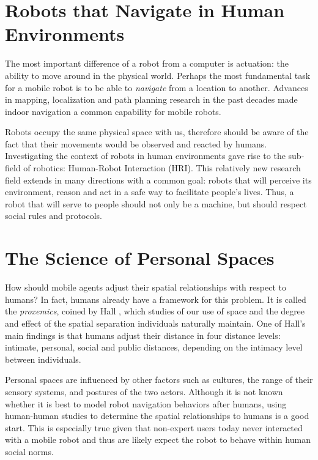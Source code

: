 \documentclass[12pt]{gatech-thesis}
\begin{document}
\section{Robots that Navigate in Human Environments}

The most important difference of a robot from a computer is actuation: the ability to move around in the physical world. Perhaps the most fundamental task for a mobile robot is to be able to \textit{navigate} from a location to another. Advances in mapping, localization and path planning research in the past decades made indoor navigation a common capability for mobile robots. 

Robots occupy the same physical space with us, therefore should be aware of the fact that their movements would be observed and reacted by humans. Investigating the context of robots in human environments gave rise to the sub-field of robotics: Human-Robot Interaction (HRI). This relatively new research field extends in many directions with a common goal: robots that will perceive its environment, reason and act in a safe way to facilitate people's lives. Thus, a robot that will serve to people should not only be a machine, but should respect social rules and protocols.

\section{The Science of Personal Spaces}
\label{sec:personal_spaces}

How should mobile agents adjust their spatial relationships with respect to humans? In fact, humans already have a framework for this problem. It is called the \textit{proxemics}, coined by Hall \cite{hall1966hidden}, which studies of our use of space and the degree and effect of the spatial separation individuals naturally maintain. One of Hall's main findings is that humans adjust their distance in four distance levels: intimate, personal, social and public distances, depending on the intimacy level between individuals.

Personal spaces are influenced by other factors such as cultures, the range of their sensory systems, and postures of the two actors. Although it is not known whether it is best to model robot navigation behaviors after humans, using human-human studies to determine the spatial relationships to humans is a good start. This is especially true given that non-expert users today never interacted with a mobile robot and thus are likely expect the robot to behave within human social norms.
\end{document}
